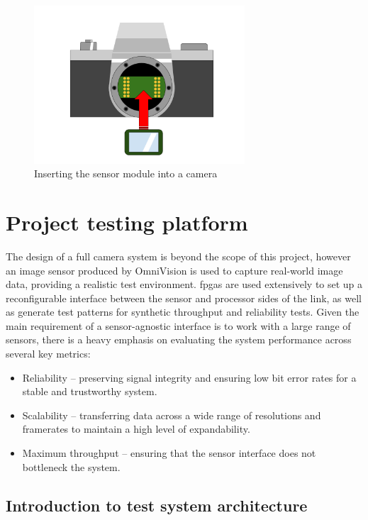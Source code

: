\begin{figure}
  \centering
  \includegraphics[width=0.7\textwidth]{./img/sensor_module.png}
  \caption{Inserting the sensor module into a camera}
  \label{fig:sensor_module}
\end{figure}



\section{Project testing platform}

The design of a full camera system is beyond the scope of this project, however an image sensor produced by OmniVision is used to capture real-world image data, providing a realistic test environment. \Glspl{fpga} are used extensively to set up a reconfigurable interface between the sensor and processor sides of the link, as well as generate test patterns for synthetic throughput and reliability tests. Given the main requirement of a sensor-agnostic interface is to work with a large range of sensors, there is a heavy emphasis on evaluating the system performance across several key metrics:

\begin{itemize}
  \item Reliability -- preserving signal integrity and ensuring low bit error rates for a stable and trustworthy system.
  \item Scalability -- transferring data across a wide range of resolutions and framerates to maintain a high level of expandability.
  \item Maximum throughput -- ensuring that the sensor interface does not bottleneck the system.
\end{itemize}

\subsection{Introduction to test system architecture}

